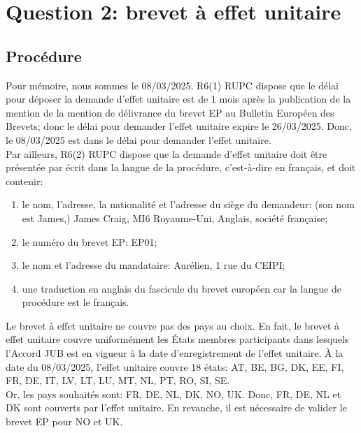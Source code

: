 \section{Question 2: brevet à effet unitaire}

\subsection{Procédure}

Pour mémoire, nous sommes le 08/03/2025. R6(1) RUPC dispose que le délai 
pour déposer la demande d'effet unitaire
  est de 1 mois après la publication de la mention de la mention de délivrance
  du brevet EP au Bulletin Européen des Brevets;
donc le délai pour demander l'effet unitaire expire le 26/03/2025.
Donc, le 08/03/2025 est dans le délai pour demander l'effet unitaire.\\

Par ailleurs, R6(2) RUPC dispose que la demande d'effet unitaire 
doit être présentée par écrit dans la langue de la procédure,
c'est-à-dire en français, et doit contenir:
\begin{enumerate}
    \renewcommand{\labelenumi}{\alph{enumi})}
    \item le nom, l'adresse, la nationalité et l'adresse du siège du demandeur: 
    (son nom est James,) James Craig, MI6 Royaume-Uni, Anglais, société française;
    \item le numéro du brevet EP: EP01;
    \item le nom et l'adresse du mandataire: Aurélien, 1 rue du CEIPI;
    \item une traduction en anglais du fascicule du brevet européen
    car la langue de procédure est le français.\\
\end{enumerate}

Le brevet à effet unitaire ne couvre pas des pays au choix. En fait, le brevet à effet unitaire
couvre uniformément les États membres participants dans lesquels l'Accord JUB est en vigueur
à la date d'enregistrement de l'effet unitaire. À la date du 08/03/2025, l'effet unitaire couvre
18 états: AT, BE, BG, DK, EE, FI, FR, DE, IT, LV, LT, LU, MT, NL, PT, RO, SI, SE.\\

Or, les pays souhaités sont: FR, DE, NL, DK, NO, UK. Donc, FR, DE, NL et DK sont couverts par
l'effet unitaire. En revanche, il est nécessaire de valider le brevet EP pour NO et UK.\\

